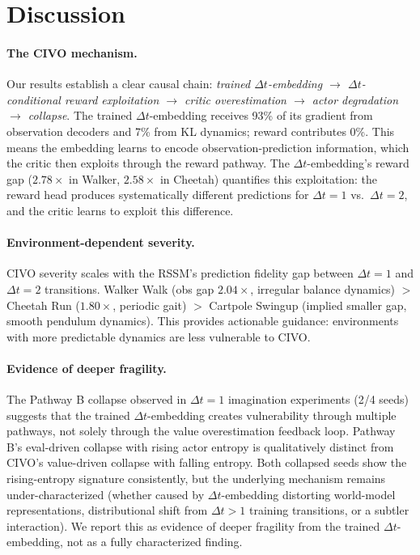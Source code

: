 \documentclass[10pt,letterpaper]{article}
\newcommand{\dt}{\Delta t}
\begin{document}
\section{Discussion}

\paragraph{The CIVO mechanism.}
Our results establish a clear causal chain: \emph{trained $\dt$-embedding $\to$ $\dt$-conditional reward exploitation $\to$ critic overestimation $\to$ actor degradation $\to$ collapse}.
The trained $\dt$-embedding receives 93\% of its gradient from observation decoders and 7\% from KL dynamics; reward contributes 0\%.
This means the embedding learns to encode observation-prediction information, which the critic then exploits through the reward pathway.
The $\dt$-embedding's reward gap ($2.78\times$ in Walker, $2.58\times$ in Cheetah) quantifies this exploitation: the reward head produces systematically different predictions for $\dt{=}1$ vs.\ $\dt{=}2$, and the critic learns to exploit this difference.

\paragraph{Environment-dependent severity.}
CIVO severity scales with the RSSM's prediction fidelity gap between $\dt{=}1$ and $\dt{=}2$ transitions.
Walker Walk (obs gap $2.04\times$, irregular balance dynamics) $>$ Cheetah Run ($1.80\times$, periodic gait) $>$ Cartpole Swingup (implied smaller gap, smooth pendulum dynamics).
This provides actionable guidance: environments with more predictable dynamics are less vulnerable to CIVO.

\paragraph{Evidence of deeper fragility.}
The Pathway B collapse observed in $\dt{=}1$ imagination experiments (2/4 seeds) suggests that the trained $\dt$-embedding creates vulnerability through multiple pathways, not solely through the value overestimation feedback loop.
Pathway B's eval-driven collapse with rising actor entropy is qualitatively distinct from CIVO's value-driven collapse with falling entropy.
Both collapsed seeds show the rising-entropy signature consistently, but the underlying mechanism remains under-characterized (whether caused by $\dt$-embedding distorting world-model representations, distributional shift from $\dt{>}1$ training transitions, or a subtler interaction).
We report this as evidence of deeper fragility from the trained $\dt$-embedding, not as a fully characterized finding.
\end{document}
